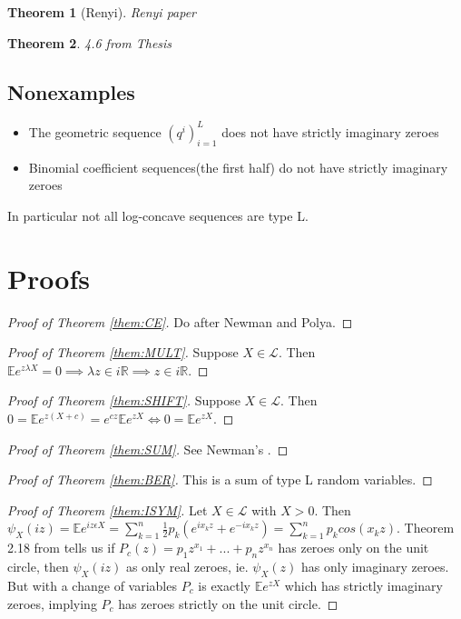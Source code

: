 \documentclass[10pt]{article}
\newcommand{\E}{\mathbb{E}}
\newcommand{\1}{\textbf{1}}
\newcommand{\R}{\mathbb{R}}
\newcommand{\lL}{\mathcal{L}}
\newtheorem{theorem}{Theorem}
\theoremstyle{remark}
\theoremstyle{definition}
\begin{document}
\begin{theorem}[Renyi] \label{RY}
	Renyi paper
\end{theorem}

\begin{theorem}
	4.6 from Thesis
\end{theorem}

\subsection{Nonexamples}

\begin{itemize}
	\item The geometric sequence $(q^i)_{i=1}^L$ does not have strictly imaginary zeroes
	\item Binomial coefficient sequences(the first half) do not have strictly imaginary zeroes
\end{itemize}

In particular not all log-concave sequences are type L.

\section{Proofs}

\begin{proof}[Proof of Theorem \ref{them:CE}]
	Do after Newman and Polya.
\end{proof}

\begin{proof}[Proof of Theorem \ref{them:MULT}]
	Suppose $X\in \lL$. Then $\E e^{z\lambda X} = 0 \implies \lambda z \in i \R \implies z \in i \R$.
\end{proof}

\begin{proof}[Proof of Theorem \ref{them:SHIFT}]
	Suppose $X \in \lL$. Then $0=\E e^{z(X+c)} = e^{cz} \E e^{zX} \iff 0 = \E e^{zX}$.
\end{proof}

\begin{proof}[Proof of Theorem \ref{them:SUM}]
	See Newman's \cite{NC}.
\end{proof}

\begin{proof}[Proof of Theorem \ref{them:BER}]
	This is a sum of type L random variables.
\end{proof}

\begin{proof}[Proof of Theorem \ref{them:ISYM}]
	Let $X \in \lL$ with $X > 0$. Then $\psi_X(i z) = \E e^{i z\epsilon X} = \sum_{k=1}^n \frac{1}{2}p_k (e^{i x_k z} + e^{-i x_k z}) = \sum_{k=1}^n p_k cos(x_k z)$. Theorem 2.18 from \cite{HP} tells us if $P_c(z) = p_1z^{x_1} + ... + p_n z^{x_n}$ has zeroes only on the unit circle,  then $\psi_X(iz)$ as only real zeroes, ie. $\psi_X(z)$ has only imaginary zeroes. But with a change of variables $P_c$ is exactly $\E e^{zX}$ which has strictly imaginary zeroes, implying $P_c$ has zeroes strictly on the unit circle. 
\end{proof}
\end{document}
